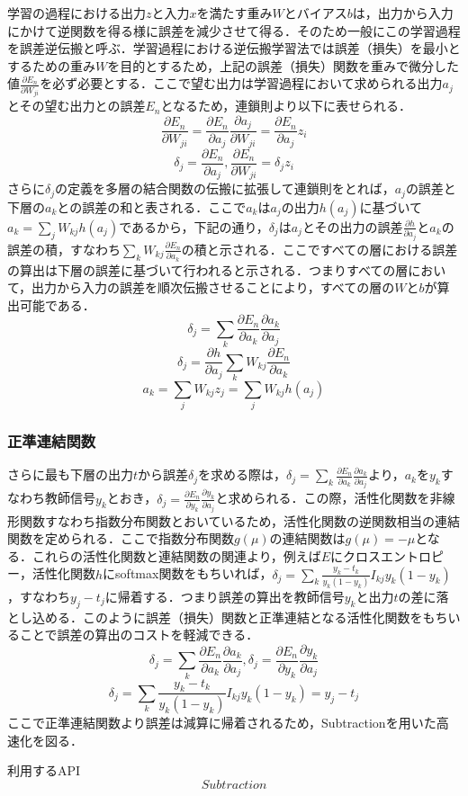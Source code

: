 \documentclass{jsarticle}
\begin{document}
学習の過程における出力$z$と入力$x$を満たす重み$W$とバイアス$b$は，出力から入力にかけて逆関数を得る様に誤差を減少させて得る．そのため一般にこの学習過程を誤差逆伝搬と呼ぶ．学習過程における逆伝搬学習法では誤差（損失）を最小とするための重み$W$を目的とするため，上記の誤差（損失）関数を重みで微分した値$\frac{\partial E_n}{\partial W_{ji}}$を必ず必要とする．ここで望む出力は学習過程において求められる出力$a_j$とその望む出力との誤差$E_n$となるため，連鎖則より以下に表せられる．
\[
\frac{\partial E_n}{\partial W_{ji}} = \frac{\partial E_n}{\partial a_j} \frac{\partial a_j}{\partial W_{ji}} = \frac{\partial E_n}{\partial a_j} z_i
\]
\[
\delta_j = \frac{\partial E_n}{\partial a_j}, \frac{\partial E_n}{\partial W_{ji}} =\delta_j z_i
\]
さらに$\delta_j$の定義を多層の結合関数の伝搬に拡張して連鎖則をとれば，$a_j$の誤差と下層の$a_k$との誤差の和と表される．ここで$a_k$は$a_j$の出力$h(a_j)$に基づいて$a_k=\sum_{j} W_{kj} h(a_j)$であるから，下記の通り，$\delta_j$は$a_j$とその出力の誤差$\frac{\partial h}{\partial a_j}$と$a_k$の誤差の積，すなわち$\sum_k W_{kj} \frac{\partial E_n}{\partial a_k}$の積と示される．ここですべての層における誤差の算出は下層の誤差に基づいて行われると示される．つまりすべての層において，出力から入力の誤差を順次伝搬させることにより，すべての層の$W$と$b$が算出可能である．
\[
\delta_j = \sum_{k} \frac{\partial E_n}{\partial a_k} \frac{\partial a_k}{\partial a_j}
\]
\[
\delta_j = \frac{\partial h}{\partial a_j} \sum_k W_{kj} \frac{\partial E_n}{\partial a_k}
\]
\[
a_k=\sum_j W_{kj} z_{j} = \sum_j W_{kj} h(a_j)
\]

\subsubsection{正準連結関数}
\label{正準連結関数}

さらに最も下層の出力$t$から誤差$\delta_j$を求める際は，$\delta_j = \sum_k \frac{\partial E_n}{\partial a_k} \frac{\partial a_k}{\partial a_j}$より，$a_k$を$y_k$すなわち教師信号$y_k$とおき，$\delta_j = \frac{\partial E_n}{\partial y_k} \frac{\partial y_k}{\partial a_j}$と求められる．この際，活性化関数を非線形関数すなわち指数分布関数とおいているため，活性化関数の逆関数相当の連結関数を定められる．ここで指数分布関数$g(\mu)$の連結関数は$g(\mu)=-\mu$となる．これらの活性化関数と連結関数の関連より，例えば$E$にクロスエントロピー，活性化関数$h$にsoftmax関数をもちいれば，$\delta_j = \sum_k \frac{y_k-t_k}{y_k(1-y_k)} I_{kj} y_k (1-y_k)$，すなわち$y_j-t_j$に帰着する．つまり誤差の算出を教師信号$y_k$と出力$t$の差に落とし込める．このように誤差（損失）関数と正準連結となる活性化関数をもちいることで誤差の算出のコストを軽減できる．
\[
\delta_j = \sum_k \frac{\partial E_n}{\partial a_k} \frac{\partial a_k}{\partial a_j},
\delta_j = \frac{\partial E_n}{\partial y_k} \frac{\partial y_k}{\partial a_j}
\]
\[
\delta_j = \sum_k \frac{y_k-t_k}{y_k(1-y_k)} I_{kj} y_k (1-y_k) = y_j - t_j
\]
ここで正準連結関数より誤差は減算に帰着されるため，Subtractionを用いた高速化を図る．
\begin{itembox}[l]{利用するAPI}
\[
Subtraction
\]
\end{itembox}
\end{document}
